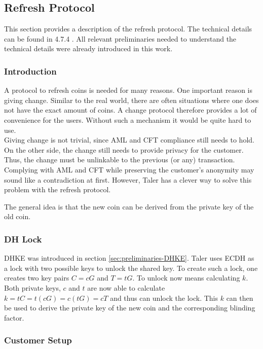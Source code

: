 \subsection{Refresh Protocol}
\label{sec:refresh-protocol}
This section provides a description of the refresh protocol.
The technical details can be found in 4.7.4 \cite{dold:the-gnu-taler-system}.
All relevant preliminaries needed to understand the technical details were already introduced in this work.

\subsubsection{Introduction}
A protocol to refresh coins is needed for many reasons.
One important reason is giving change.
Similar to the real world, there are often situations where one does not have the exact amount of coins.
A change protocol therefore provides a lot of convenience for the users.
Without such a mechanism it would be quite hard to use. \\
Giving change is not trivial, since \ac{AML} and \ac{CFT} compliance still needs to hold.
On the other side, the change still needs to provide privacy for the customer.
Thus, the change must be unlinkable to the previous (or any) transaction.\\
Complying with \ac{AML} and \ac{CFT} while preserving the customer's anonymity may sound like a contradiction at first.
However, Taler has a clever way to solve this problem with the refresh protocol.

The general idea is that the new coin can be derived from the private key of the old coin.

\subsubsection{DH Lock}
\ac{DHKE} was introduced in section \ref{sec:preliminaries-DHKE}.
Taler uses \ac{ECDH} as a lock with two possible keys to unlock the shared key.
To create such a lock, one creates two key pairs $C = cG$ and $T = tG$.
To unlock now means calculating $k$.
Both private keys, $c$ and $t$ are now able to calculate $k = tC = t(cG) = c(tG) = cT$ and thus can unlock the lock.
This $k$ can then be used to derive the private key of the new coin and the corresponding blinding factor.

\subsubsection{Customer Setup}

